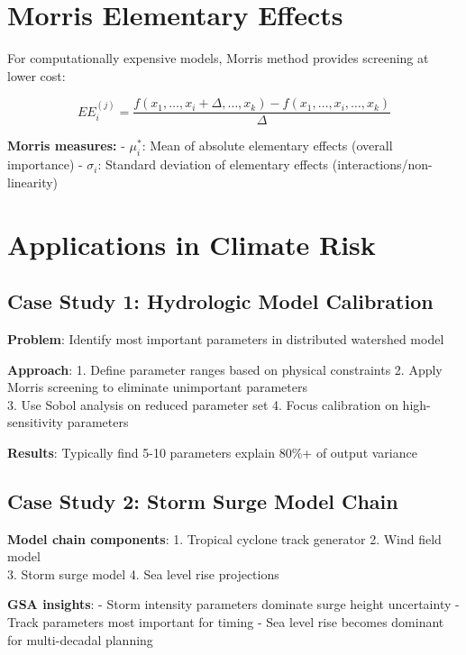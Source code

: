\documentclass[
  letterpaper,
  DIV=11,
  numbers=noendperiod]{scrreprt}
\begin{document}
\section{Morris Elementary Effects}\label{morris-elementary-effects}

For computationally expensive models, Morris method provides screening
at lower cost:

\[
EE_i^{(j)} = \frac{f(x_1, \ldots, x_i + \Delta, \ldots, x_k) - f(x_1, \ldots, x_i, \ldots, x_k)}{\Delta}
\]

\textbf{Morris measures:} - \(\mu^*_i\): Mean of absolute elementary
effects (overall importance) - \(\sigma_i\): Standard deviation of
elementary effects (interactions/non-linearity)

\section{Applications in Climate
Risk}\label{applications-in-climate-risk}

\subsection{Case Study 1: Hydrologic Model
Calibration}\label{case-study-1-hydrologic-model-calibration}

\textbf{Problem}: Identify most important parameters in distributed
watershed model

\textbf{Approach}: 1. Define parameter ranges based on physical
constraints 2. Apply Morris screening to eliminate unimportant
parameters\\
3. Use Sobol analysis on reduced parameter set 4. Focus calibration on
high-sensitivity parameters

\textbf{Results}: Typically find 5-10 parameters explain 80\%+ of output
variance

\subsection{Case Study 2: Storm Surge Model
Chain}\label{case-study-2-storm-surge-model-chain}

\textbf{Model chain components}: 1. Tropical cyclone track generator 2.
Wind field model\\
3. Storm surge model 4. Sea level rise projections

\textbf{GSA insights}: - Storm intensity parameters dominate surge
height uncertainty - Track parameters most important for timing - Sea
level rise becomes dominant for multi-decadal planning
\end{document}

